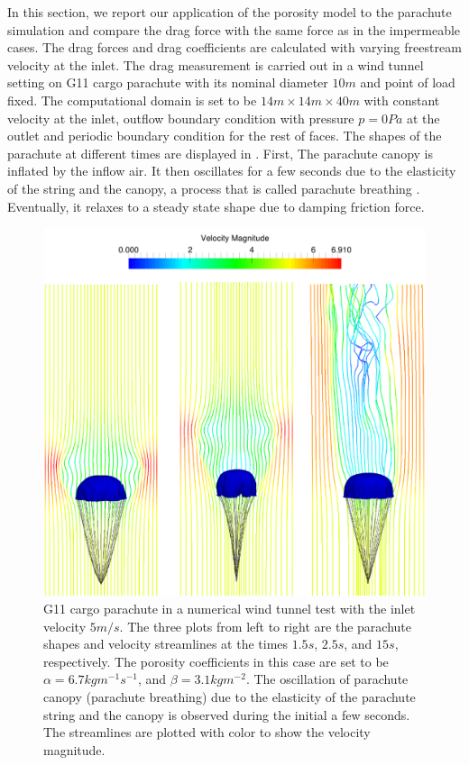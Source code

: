 In this section, we report our application of
the porosity model to the parachute simulation and compare the drag force with 
the same force as in the impermeable cases. The drag forces and drag
coefficients are calculated with varying freestream velocity at the inlet.
The drag measurement is carried out in a wind tunnel setting on G11 cargo
parachute with its nominal diameter $10 m$ and point of load fixed. The computational  
domain is set to be $14 m\times14 m\times40 m$ with constant velocity at the inlet, 
outflow boundary condition with pressure $p = 0 Pa$ at the outlet and periodic boundary 
condition for the rest of faces. The shapes of the parachute at different times are 
displayed in . First, The parachute canopy is inflated by the 
inflow air. It then oscillates for a few seconds due to the elasticity of the string and the 
canopy, a process that is called parachute breathing \cite{roberts1974axisymmetric}. 
Eventually, it relaxes to a steady state shape due to damping friction force.

\begin{figure}[!htbp] \centering
\includegraphics[width= 1.0\columnwidth]{Figures/drag_test} 
\caption{G11 cargo parachute in a numerical wind tunnel test
with the inlet velocity $5m/s$. The three plots from left to right are
the parachute shapes and velocity streamlines at 
the times $1.5s$, $2.5s$, and $15s$, respectively. The porosity 
coefficients in this case are set to be $\alpha = 6.7kgm^{-1}s^{-1}$, 
and $\beta = 3.1kgm^{-2}$. The oscillation of 
parachute canopy (parachute breathing) due to the elasticity of the parachute
string and the canopy is observed during the initial a few seconds. 
The streamlines are plotted with color 
to show the velocity magnitude.}
\label{fig:drag_test} \end{figure}

